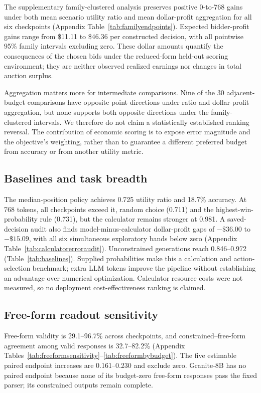 \documentclass{article}
\begin{document}
The supplementary family-clustered analysis preserves positive 0-to-768 gains under both mean scenario utility ratio and mean dollar-profit aggregation for all six checkpoints (Appendix Table~\ref{tab:familyendpoints}). Expected bidder-profit gains range from \$11.11 to \$46.36 per constructed decision, with all pointwise 95\% family intervals excluding zero. These dollar amounts quantify the consequences of the chosen bids under the reduced-form held-out scoring environment; they are neither observed realized earnings nor changes in total auction surplus.

Aggregation matters more for intermediate comparisons. Nine of the 30 adjacent-budget comparisons have opposite point directions under ratio and dollar-profit aggregation, but none supports both opposite directions under the family-clustered intervals. We therefore do not claim a statistically established ranking reversal. The contribution of economic scoring is to expose error magnitude and the objective's weighting, rather than to guarantee a different preferred budget from accuracy or from another utility metric.

\subsection{Baselines and task breadth}

The median-position policy achieves 0.725 utility ratio and 18.7\% accuracy. At 768 tokens, all checkpoints exceed it, random choice (0.711) and the highest-win-probability rule (0.731), but the calculator remains stronger at 0.981. A saved-decision audit also finds model-minus-calculator dollar-profit gaps of $-\$36.00$ to $-\$15.09$, with all six simultaneous exploratory bands below zero (Appendix Table~\ref{tab:calculatorerroraudit}). Unconstrained generations reach 0.846--0.972 (Table~\ref{tab:baselines}). Supplied probabilities make this a calculation and action-selection benchmark; extra LLM tokens improve the pipeline without establishing an advantage over numerical optimization. Calculator resource costs were not measured, so no deployment cost-effectiveness ranking is claimed.

\subsection{Free-form readout sensitivity}

Free-form validity is 29.1--96.7\% across checkpoints, and constrained--free-form agreement among valid responses is 32.7--82.2\% (Appendix Tables~\ref{tab:freeformsensitivity}--\ref{tab:freeformbybudget}). The five estimable paired endpoint increases are 0.161--0.230 and exclude zero. Granite-8B has no paired endpoint because none of its budget-zero free-form responses pass the fixed parser; its constrained outputs remain complete.
\end{document}
